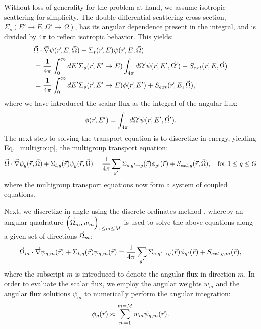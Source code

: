 Without loss of generality for the problem at hand, we assume isotropic scattering for simplicity. The double differential scattering cross section, $\Sigma_s(E'\to E, \Omega'\to\Omega)$, has its angular dependence present in the integral, and is divided by $4\pi$ to reflect isotropic behavior. This yields:
\begin{align}
\label{isotropic}
  &\vec{\Omega} \cdot \vec \nabla \psi(\vec{r},E,\vec{\Omega}) +\Sigma_t(\vec{r},E) \psi(\vec{r},E,\vec{\Omega}) \nonumber \\
& = \frac{1}{4\pi}\int_{0}^{\infty}dE' \Sigma_s(\vec{r},E'\to E) \int_{4\pi}d\Omega' \psi(\vec{r},E',\vec{\Omega}')  + S_{ext}(\vec{r},E,\vec{\Omega}) \nonumber \\
& = \frac{1}{4\pi}\int_{0}^{\infty}dE' \Sigma_s(\vec{r},E'\to E) \phi(\vec{r},E')  + S_{ext}(\vec{r},E,\vec{\Omega}) ,
\end{align}
where we have introduced the scalar flux as the integral of the angular flux:
\begin{equation}
\label{def_scalar_flux}
\phi(\vec{r},E') = \int_{4\pi}d\Omega' \psi(\vec{r},E',\vec{\Omega}').
\end{equation}
The next step to solving the transport equation is to discretize in energy, yielding Eq.~\eqref{multigroup}, the multigroup transport equation:
\begin{equation}
\vec{\Omega} \cdot \vec \nabla \psi_g(\vec{r},\vec{\Omega}) +\Sigma_{t,g}(\vec{r}) \psi_g(\vec{r},\vec{\Omega}) = \frac{1}{4\pi}\sum_{g^{\prime}}\Sigma_{s,g^{\prime}\to g}(\vec{r})\phi_{g^{\prime}}(\vec{r}) + S_{ext,g}(\vec{r},\vec{\Omega}), \quad \text{for } 1 \le g \le G
\label{multigroup}
\end{equation}
where the multigroup transport equations now form a system of coupled equations.

Next, we discretize in angle using the discrete ordinates method \cite{denovo}, whereby an angular quadrature $\left( \vec{\Omega}_m, w_m \right)_{1 \le m \le M}$ is used to solve the above equations along a given set of directions $\vec{\Omega}_m$:
\begin{equation}
\vec{\Omega}_m \cdot \vec \nabla \psi_{g,m}(\vec{r}) +\Sigma_{t,g}(\vec{r}) \psi_{g,m}(\vec{r})  = \frac{1}{4\pi}\sum_{g^{\prime}}\Sigma_{s,g^{\prime}\to g}(\vec{r})\phi_{g^{\prime}}(\vec{r}) + S_{ext,g,m}(\vec{r}),
\label{angle}
\end{equation}
where the subscript $m$ is introduced to denote the angular flux in direction $m$. In order to evaluate the scalar flux, we employ the angular weights $w_m$ and the angular flux solutions
$\psi_m$ to numerically perform the angular integration:
\begin{equation}
\label{def_scalar_flux_2}
\phi_g(\vec{r}) \approx \sum_{m=1}^{m=M} w_m \psi_{g,m}(\vec{r}).
\end{equation}

